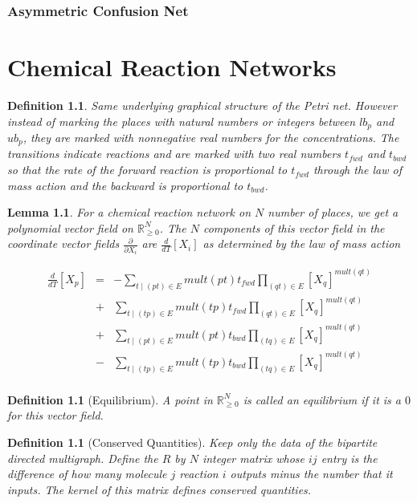 \documentclass[11pt]{book}
\theoremstyle{change}
\newtheorem{definition}[equation]{Definition}
\newtheorem{lemma}[equation]{Lemma}
\theoremstyle{nonumberplain}
\numberwithin{equation}{section}
\begin{document}
\subsection{Asymmetric Confusion Net}

\chapter{Chemical Reaction Networks}

\begin{definition}
Same underlying graphical structure of the Petri net. However instead of marking the places with natural numbers or integers between $lb_p$ and $ub_p$, they are marked with nonnegative real numbers for the concentrations. The transitions indicate reactions and are marked with two real numbers $t_{fwd}$ and $t_{bwd}$ so that the rate of the forward reaction is proportional to $t_{fwd}$ through the law of mass action and the backward is proportional to $t_{bwd}$.
\end{definition}

\begin{lemma}
For a chemical reaction network on $N$ number of places, we get a polynomial vector field on $\mathbb{R}_{\geq 0}^N$. The $N$ components of this vector field in the coordinate vector fields $\frac{\partial}{\partial X_i}$ are $\frac{d}{dT} [X_i]$ as determined by the law of mass action

\begin{eqnarray*}
\frac{d}{dT} [X_p] &=& - \sum_{t \mid (pt) \in E}  mult(pt) t_{fwd} \prod_{(qt) \in E} [X_q]^{mult(qt)}\\
&+& \sum_{t \mid (tp) \in E} mult(tp) t_{fwd} \prod_{(qt) \in E} [X_q]^{mult(qt)}\\
&+& \sum_{t \mid (pt) \in E} mult(pt) t_{bwd} \prod_{(tq) \in E} [X_q]^{mult(qt)}\\
&-& \sum_{t \mid (tp) \in E} mult(tp) t_{bwd} \prod_{(tq) \in E} [X_q]^{mult(qt)}\\
\end{eqnarray*}

\end{lemma}

\begin{definition}[Equilibrium]
A point in $\mathbb{R}_{\geq 0}^N$ is called an equilibrium if it is a $0$ for this vector field.
\end{definition}

\begin{definition}[Conserved Quantities]
Keep only the data of the bipartite directed multigraph. Define the $R$ by $N$ integer matrix whose $ij$ entry is the difference of how many molecule $j$ reaction $i$ outputs minus the number that it inputs. The kernel of this matrix defines conserved quantities.
\end{definition}
\end{document}
